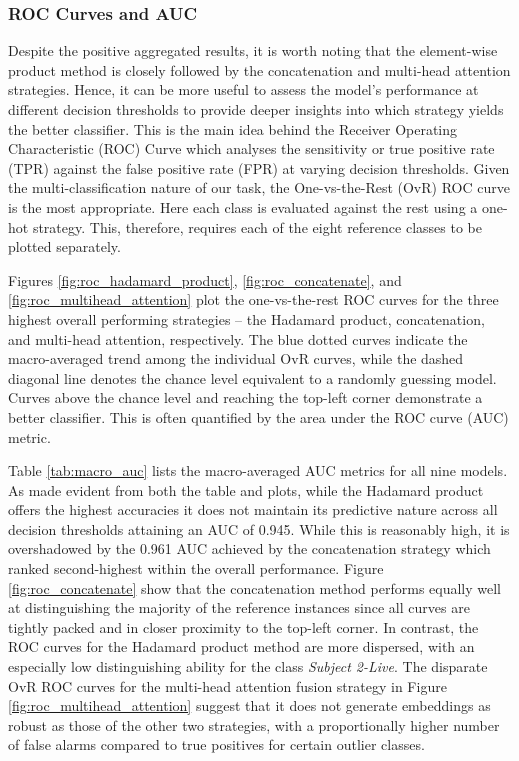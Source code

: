 \documentclass{mpaper}
\begin{document}
\subsubsection{ROC Curves and AUC}
Despite the positive aggregated results, it is worth noting that the element-wise product method is closely followed by the concatenation and multi-head attention strategies. Hence, it can be more useful to assess the model's performance at different decision thresholds to provide deeper insights into which strategy yields the better classifier. This is the main idea behind the Receiver Operating Characteristic (ROC) Curve which analyses the sensitivity or true positive rate (TPR) against the false positive rate (FPR) at varying decision thresholds. Given the multi-classification nature of our task, the One-vs-the-Rest (OvR) ROC curve is the most appropriate. Here each class is evaluated against the rest using a one-hot strategy. This, therefore, requires each of the eight reference classes to be plotted separately.

Figures \ref{fig:roc_hadamard_product}, \ref{fig:roc_concatenate}, and \ref{fig:roc_multihead_attention} plot the one-vs-the-rest ROC curves for the three highest overall performing strategies -- the \linebreak Hadamard product, concatenation, and multi-head attention, respectively. The blue dotted curves indicate the macro-averaged trend among the individual OvR curves, while the dashed diagonal line denotes the chance level equivalent to a randomly guessing model. Curves above the chance level and reaching the top-left corner demonstrate a better classifier. This is often quantified by the area under the ROC curve (AUC) metric.

Table \ref{tab:macro_auc} lists the macro-averaged AUC metrics for all nine models. As made evident from both the table and plots, while the Hadamard product offers the highest accuracies it does not maintain its predictive nature across all decision thresholds attaining an AUC of 0.945. While this is reasonably high, it is overshadowed by the 0.961 AUC achieved by the concatenation strategy which ranked second-highest within the overall performance. Figure \ref{fig:roc_concatenate} show that the concatenation method performs equally well at distinguishing the majority of the reference instances since all curves are tightly packed and in closer proximity to the top-left corner. In contrast, the ROC curves for the Hadamard product method are more dispersed, with an especially low distinguishing ability for the class \textit{Subject 2-Live}. The disparate OvR ROC curves for the multi-head attention fusion strategy in Figure \ref{fig:roc_multihead_attention} suggest that it does not generate embeddings as robust as those of the other two strategies, with a proportionally higher number of false alarms compared to true positives for certain outlier classes.
\end{document}
